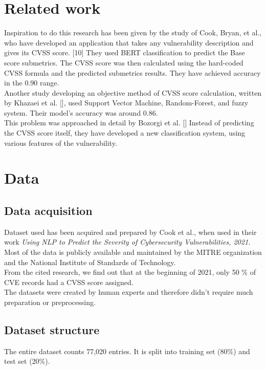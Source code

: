 \documentclass[times, utf8, zavrsni, english]{fer}
\begin{document}
\chapter{Related work}
Inspiration to do this research has been given by the study of Cook, Bryan, et al., who have developed an application that takes any vulnerability description and gives its CVSS score. [10] They used BERT classification to predict the Base score submetrics. The CVSS score was then calculated using the hard-coded CVSS formula and the predicted submetrics results. They have achieved accuracy in the 0.90 range. \\

Another study developing an objective method of CVSS score calculation, written by Khazaei et al. [], used Support Vector Machine, Random-Forest, and fuzzy system. Their model's accuracy was around 0.86. \\

This problem was approached in detail by Bozorgi et al. [] Instead of predicting the CVSS score itself, they have developed a new classification system, using various features of the vulnerability. \\

\chapter{Data}
\section{Data acquisition}
Dataset used has been acquired and prepared by Cook et al., when used in their work \emph{Using NLP to Predict the Severity of Cybersecurity Vulnerabilities, 2021.}
Most of the data is publicly available and maintained by the MITRE organization and the National Institute of Standards of Technology. \\
From the cited research, we find out that at the beginning of 2021, only 50 \% of CVE records had a CVSS score assigned. \\
The datasets were created by human experts and therefore didn't require much preparation or preprocessing. 

\section{Dataset structure}
The entire dataset counts 77,020 entries. It is split into training set (80\%) and test set (20\%).
\end{document}
